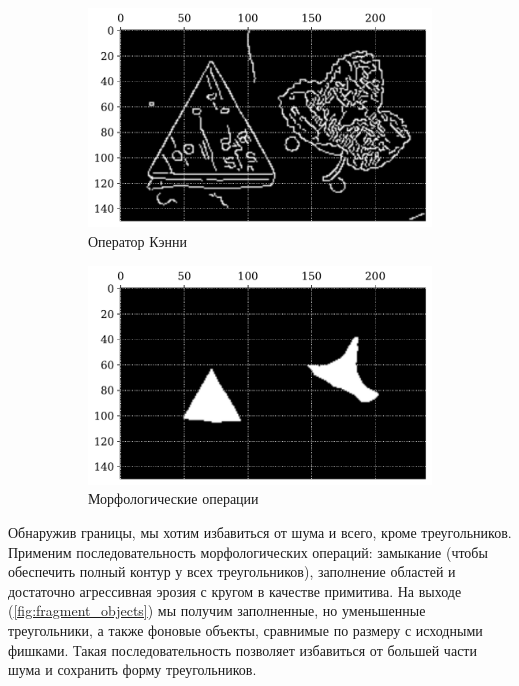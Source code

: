 \documentclass[12pt]{article}
\begin{document}
\begin{figure}[!h]
    \begin{subfigure}{.45\linewidth}
        \includegraphics[width=.93\linewidth]{fragment_canny.pdf}
        \centering
        \caption{Оператор Кэнни}
        \label{fig:fragment_canny}
    \end{subfigure}
    \begin{subfigure}{.45\linewidth}
        \includegraphics[width=.93\linewidth]{fragment_objects.pdf}
        \centering
        \caption{Морфологические операции}
        \label{fig:fragment_objects}
    \end{subfigure}
    \centering
    \caption{}
\end{figure}

Обнаружив границы, мы хотим избавиться от шума и всего, кроме треугольников. Применим последовательность морфологических операций: замыкание (чтобы обеспечить полный контур у всех треугольников), заполнение областей и достаточно агрессивная эрозия с кругом в качестве примитива. На выходе (\autoref{fig:fragment_objects}) мы получим заполненные, но уменьшенные треугольники, а также фоновые объекты, сравнимые по размеру с исходными фишками. Такая последовательность позволяет избавиться от большей части шума и сохранить форму треугольников.
\end{document}
